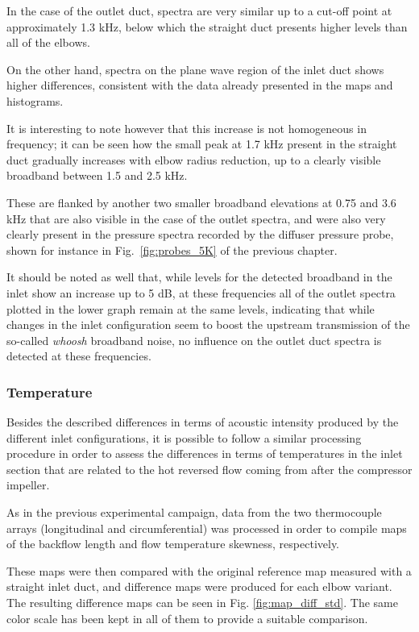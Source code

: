 In the case of the outlet duct, spectra are very similar up to a cut-off point at approximately 1.3 kHz, below which the straight duct presents higher levels than all of the elbows.

On the other hand, spectra on the plane wave region of the inlet duct shows higher differences, consistent with the data already presented in the maps and histograms. 

It is interesting to note however that this increase is not homogeneous in frequency; it can be seen how the small peak at 1.7 kHz present in the straight duct gradually increases with elbow radius reduction, up to a clearly visible broadband between 1.5 and 2.5 kHz.

These are flanked by another two smaller broadband elevations at 0.75 and 3.6 kHz that are also visible in the case of the outlet spectra, and were also very clearly present in the pressure spectra recorded by the diffuser pressure probe, shown for instance in Fig.~\ref{fig:probes_5K} of the previous chapter.

It should be noted as well that, while levels for the detected broadband in the inlet show an increase up to 5 dB, at these frequencies all of the outlet spectra plotted in the lower graph remain at the same levels, indicating that while changes in the inlet configuration seem to boost the upstream transmission of the so-called \emph{whoosh} broadband noise, no influence on the outlet duct spectra is detected at these frequencies.

\subsubsection{Temperature}

Besides the described differences in terms of acoustic intensity produced by the different inlet configurations, it is possible to follow a similar processing procedure in order to assess the differences in terms of temperatures in the inlet section that are related to the hot reversed flow coming from after the compressor impeller.

As in the previous experimental campaign, data from the two thermocouple arrays (longitudinal and circumferential) was processed in order to compile maps of the backflow length and flow temperature skewness, respectively.

These maps were then compared with the original reference map measured with a straight inlet duct, and difference maps were produced for each elbow variant. The resulting difference maps can be seen in Fig. \ref{fig:map_diff_std}. The same color scale has been kept in all of them to provide a suitable comparison.

